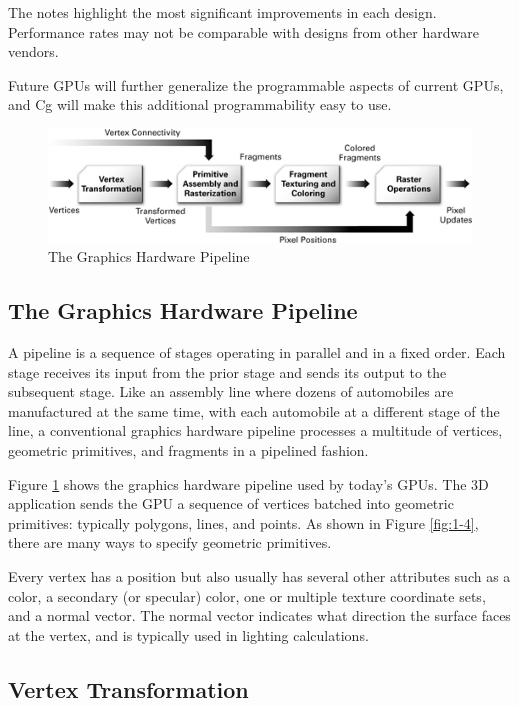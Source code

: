 \documentclass{book}
\begin{document}
The notes highlight the most significant improvements in each design. Performance rates may not be comparable with designs from other hardware vendors.

Future GPUs will further generalize the programmable aspects of current GPUs, and Cg will make this additional programmability easy to use.

\begin{figure}
    \centering
    \includegraphics[width=1\linewidth]{Images/fig1_3.jpg}
    \caption{The Graphics Hardware Pipeline}
    \label{fig:1-3}
\end{figure}

\subsection{The Graphics Hardware Pipeline}

A pipeline is a sequence of stages operating in parallel and in a fixed order. Each stage receives its input from the prior stage and sends its output to the subsequent stage. Like an assembly line where dozens of automobiles are manufactured at the same time, with each automobile at a different stage of the line, a conventional graphics hardware pipeline processes a multitude of vertices, geometric primitives, and fragments in a pipelined fashion.

Figure \ref{fig:1-3} shows the graphics hardware pipeline used by today's GPUs. The 3D application sends the GPU a sequence of vertices batched into geometric primitives: typically polygons, lines, and points. As shown in Figure \ref{fig:1-4}, there are many ways to specify geometric primitives.

Every vertex has a position but also usually has several other attributes such as a color, a secondary (or specular) color, one or multiple texture coordinate sets, and a normal vector. The normal vector indicates what direction the surface faces at the vertex, and is typically used in lighting calculations.

\subsection*{Vertex Transformation}
\end{document}
